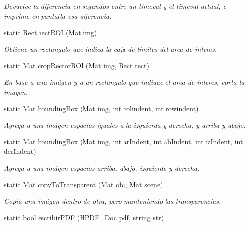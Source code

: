 \begin{DoxyCompactItemize}
\begin{DoxyCompactList}\small\item\em Devuelve la diferencia en segundos entre un timeval y el timeval actual, e imprime en pantalla esa diferencia. \end{DoxyCompactList}\item 
static Rect \mbox{\hyperlink{classCommonFunctions_aaa36dbe5e5b5be0caf0af58306f333bf}{rect\+R\+OI}} (Mat img)
\begin{DoxyCompactList}\small\item\em Obtiene un rectangulo que indica la caja de límites del area de interes. \end{DoxyCompactList}\item 
static Mat \mbox{\hyperlink{classCommonFunctions_a59211fa9ca611fd09496f4e376649ab2}{crop\+Rector\+R\+OI}} (Mat img, Rect rect)
\begin{DoxyCompactList}\small\item\em En base a una imágen y a un rectangulo que indique el area de interes, corta la imagen. \end{DoxyCompactList}\item 
static Mat \mbox{\hyperlink{classCommonFunctions_a4a2a24e283f18beb6e217993924759c6}{bounding\+Box}} (Mat img, int colindent, int rowindent)
\begin{DoxyCompactList}\small\item\em Agrega a una imágen espacios iguales a la izquierda y derecha, y arriba y abajo. \end{DoxyCompactList}\item 
static Mat \mbox{\hyperlink{classCommonFunctions_aaeebbb5957d3384fa121e5d231de03ab}{bounding\+Box}} (Mat img, int ar\+Indent, int ab\+Indent, int iz\+Indent, int der\+Indent)
\begin{DoxyCompactList}\small\item\em Agrega a una imágen espacios arriba, abajo, izquierda y derecha. \end{DoxyCompactList}\item 
static Mat \mbox{\hyperlink{classCommonFunctions_a8cd6fcf506c80ec5bcbc8edd26004cc3}{copy\+To\+Transparent}} (Mat obj, Mat scene)
\begin{DoxyCompactList}\small\item\em Copia una imágen dentro de otra, pero manteniendo las transparencias. \end{DoxyCompactList}\item 
static bool \mbox{\hyperlink{classCommonFunctions_a188e7c8fcb797856482ecfd4010c62a9}{escribir\+P\+DF}} (H\+P\+D\+F\+\_\+\+Doc pdf, string str)

\end{DoxyCompactItemize}
